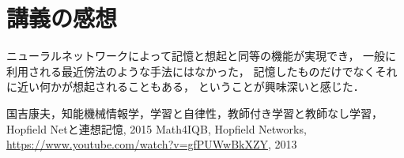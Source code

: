 \documentclass[10pt,twocolumn]{jarticle}
\begin{document}
\section{講義の感想}
ニューラルネットワークによって記憶と想起と同等の機能が実現でき，
一般に利用される最近傍法のような手法にはなかった，
記憶したものだけでなくそれに近い何かが想起されることもある，
ということが興味深いと感じた．


\begin{thebibliography}{9}
   国吉康夫，知能機械情報学，学習と自律性，教師付き学習と教師なし学習，Hopfield Netと連想記憶, 2015
   Math4IQB, Hopfield Networks, \url{https://www.youtube.com/watch?v=gfPUWwBkXZY}, 2013
\end{thebibliography}
\end{document}

